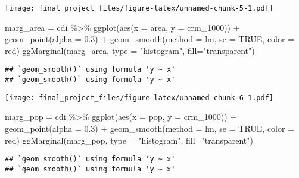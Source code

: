 \documentclass[
]{article}
\newenvironment{Shaded}{\begin{snugshade}}{\end{snugshade}}
\newcommand{\AttributeTok}[1]{\textcolor[rgb]{0.77,0.63,0.00}{#1}}
\newcommand{\ConstantTok}[1]{\textcolor[rgb]{0.00,0.00,0.00}{#1}}
\newcommand{\FloatTok}[1]{\textcolor[rgb]{0.00,0.00,0.81}{#1}}
\newcommand{\FunctionTok}[1]{\textcolor[rgb]{0.00,0.00,0.00}{#1}}
\newcommand{\NormalTok}[1]{#1}
\newcommand{\OtherTok}[1]{\textcolor[rgb]{0.56,0.35,0.01}{#1}}
\newcommand{\SpecialCharTok}[1]{\textcolor[rgb]{0.00,0.00,0.00}{#1}}
\newcommand{\StringTok}[1]{\textcolor[rgb]{0.31,0.60,0.02}{#1}}
\begin{document}
\texttt{[image: final\_project\_files/figure-latex/unnamed-chunk-5-1.pdf]}

\begin{Shaded}
\begin{Highlighting}[]
\NormalTok{marg\_area }\OtherTok{=}\NormalTok{ cdi }\SpecialCharTok{\%\textgreater{}\%} \FunctionTok{ggplot}\NormalTok{(}\FunctionTok{aes}\NormalTok{(}\AttributeTok{x =}\NormalTok{ area, }\AttributeTok{y =}\NormalTok{ crm\_1000)) }\SpecialCharTok{+} \FunctionTok{geom\_point}\NormalTok{(}\AttributeTok{alpha =} \FloatTok{0.3}\NormalTok{) }\SpecialCharTok{+} \FunctionTok{geom\_smooth}\NormalTok{(}\AttributeTok{method =} \StringTok{\textquotesingle{}lm\textquotesingle{}}\NormalTok{, }\AttributeTok{se =} \ConstantTok{TRUE}\NormalTok{, }\AttributeTok{color =} \StringTok{\textquotesingle{}red\textquotesingle{}}\NormalTok{)}
\FunctionTok{ggMarginal}\NormalTok{(marg\_area, }\AttributeTok{type =} \StringTok{"histogram"}\NormalTok{, }\AttributeTok{fill=}\StringTok{"transparent"}\NormalTok{)}
\end{Highlighting}
\end{Shaded}

\begin{verbatim}
## `geom_smooth()` using formula 'y ~ x'
## `geom_smooth()` using formula 'y ~ x'
\end{verbatim}

\texttt{[image: final\_project\_files/figure-latex/unnamed-chunk-6-1.pdf]}

\begin{Shaded}
\begin{Highlighting}[]
\NormalTok{marg\_pop }\OtherTok{=}\NormalTok{ cdi }\SpecialCharTok{\%\textgreater{}\%} \FunctionTok{ggplot}\NormalTok{(}\FunctionTok{aes}\NormalTok{(}\AttributeTok{x =}\NormalTok{ pop, }\AttributeTok{y =}\NormalTok{ crm\_1000)) }\SpecialCharTok{+} \FunctionTok{geom\_point}\NormalTok{(}\AttributeTok{alpha =} \FloatTok{0.3}\NormalTok{) }\SpecialCharTok{+} \FunctionTok{geom\_smooth}\NormalTok{(}\AttributeTok{method =} \StringTok{\textquotesingle{}lm\textquotesingle{}}\NormalTok{, }\AttributeTok{se =} \ConstantTok{TRUE}\NormalTok{, }\AttributeTok{color =} \StringTok{\textquotesingle{}red\textquotesingle{}}\NormalTok{)}
\FunctionTok{ggMarginal}\NormalTok{(marg\_pop, }\AttributeTok{type =} \StringTok{"histogram"}\NormalTok{, }\AttributeTok{fill=}\StringTok{"transparent"}\NormalTok{)}
\end{Highlighting}
\end{Shaded}

\begin{verbatim}
## `geom_smooth()` using formula 'y ~ x'
## `geom_smooth()` using formula 'y ~ x'
\end{verbatim}
\end{document}
